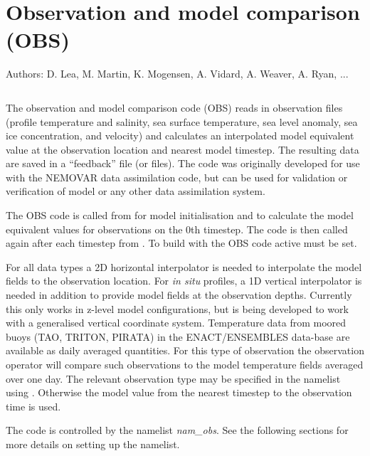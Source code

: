 \documentclass[NEMO_book]{subfiles}
\begin{document}
\chapter{Observation and model comparison (OBS)}
\label{OBS}

Authors: D. Lea, M. Martin, K. Mogensen, A. Vidard, A. Weaver, A. Ryan, ...   %

\minitoc


\newpage
$\ $\newline    %

The observation and model comparison code (OBS) reads in observation files (profile
temperature and salinity, sea surface temperature, sea level anomaly, sea ice concentration,
and velocity) and calculates  an interpolated model equivalent value at the observation
location and nearest model timestep. The resulting data are saved in a ``feedback'' file (or
files). The code was originally developed for use with the NEMOVAR data assimilation code, but
can be used for validation or verification of model or  any other data assimilation system.

The OBS code is called from  for model initialisation and to calculate the model
equivalent values for observations on the 0th timestep. The code is then called again after
each timestep from . To build with the OBS code active  must be
set.

For all data types a 2D horizontal  interpolator is needed to interpolate the model fields to
the observation location. For {\em in situ} profiles, a 1D vertical interpolator is needed in
addition to provide model fields at the observation depths. Currently this only works in
z-level model configurations, but is being developed to work with a generalised vertical
coordinate system. Temperature data from moored buoys (TAO, TRITON, PIRATA) in the
ENACT/ENSEMBLES data-base are available as daily averaged quantities. For this type of
observation the observation operator will compare such observations to the model temperature
fields averaged over one day. The relevant observation type may be specified in the namelist
using . Otherwise the model value from the nearest timestep to the
observation time is used.

The code is controlled by the namelist \textit{nam\_obs}. See the following sections for more
details on setting up the namelist. 
\end{document}
